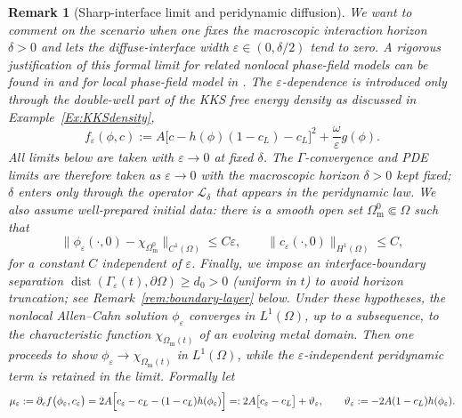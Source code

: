 \documentclass[]{article}
\newtheorem{remark}{Remark}[section]
\newcommand{\eps}{\varepsilon}
\newcommand{\dx}{\,\textup{d}x}
\newcommand{\dy}{\,\textup{d}y}
\begin{document}
\begin{remark}[Sharp-interface limit and peridynamic diffusion] \label{sec:structural_equivalence} 
	We want to comment on the scenario when one fixes the macroscopic interaction horizon
	$\delta>0$ and lets the diffuse-interface width
	$\varepsilon\in(0,\delta/2)$ tend to zero. A rigorous justification of this formal limit for related nonlocal phase-field models can be found in \cite{burkovska2021nonlocal,seleson2013interface} and for local phase-field model in \cite{noldner2023sharp}.  The $\eps$-dependence is introduced only through the
	double-well part of the KKS free energy density as discussed in Example~\ref{Ex:KKSdensity},
	\[
	f_\varepsilon(\phi,c)
	:= A\bigl[c-h(\phi)(1-c_L)-c_L\bigr]^{2}
	+\frac{\omega}{\varepsilon}g(\phi).
	\]
	All limits below are taken with \(\varepsilon\to0\) at \emph{fixed}
	\(\delta\). The $\Gamma$-convergence and PDE limits are therefore taken as
	$\varepsilon\to0$ with the macroscopic horizon $\delta>0$ kept
	fixed; $\delta$ enters only through the operator $\mathcal L_\delta$ that
	appears in the peridynamic law. We also assume well-prepared initial data: there is a smooth open set
	$\Omega_{\mathrm m}^{0}\Subset\Omega$ such that
	\[
	\|\phi_\varepsilon(\cdot,0)-\chi_{\Omega_{\mathrm m}^{0}}\|_{C^{1}(\Omega)}
	\le C\varepsilon,
	\qquad
	\|c_\varepsilon(\cdot,0)\|_{H^{1}(\Omega)}\le C,
	\]
	for a constant $C$ independent of $\varepsilon$.
	Finally, we impose an interface-boundary separation
	$\operatorname{dist}(\Gamma_\varepsilon(t),\partial\Omega)\ge
	d_0>0$ (uniform in $t$) to avoid horizon truncation; see
	Remark~\ref{rem:boundary-layer} below.
	Under these hypotheses, the nonlocal Allen--Cahn solution
	$\phi_\varepsilon$ converges in $L^{1}(\Omega)$, up to a subsequence, to
	the characteristic function $\chi_{\Omega_{\mathrm m}(t)}$ of an
	evolving metal domain.  Then one proceeds to show $\phi_\varepsilon\to\chi_{\Omega_{\mathrm m}(t)}$ in $L^{1}(\Omega)$,
	while the $\varepsilon$-independent peridynamic term is
	retained in the limit. Formally let
	\[
	\mu_\varepsilon
	:=\partial_c f\bigl(\phi_\varepsilon,c_\varepsilon\bigr)
	=2A\Bigl[c_\varepsilon-c_L-(1-c_L)h(\phi_\varepsilon)\Bigr]
	=:2A\bigl[c_\varepsilon-c_L\bigr]+\vartheta_\varepsilon,
	\qquad
	\vartheta_\varepsilon:=-2A(1-c_L)h(\phi_\varepsilon).
	\]
	

\end{remark}
\end{document}
